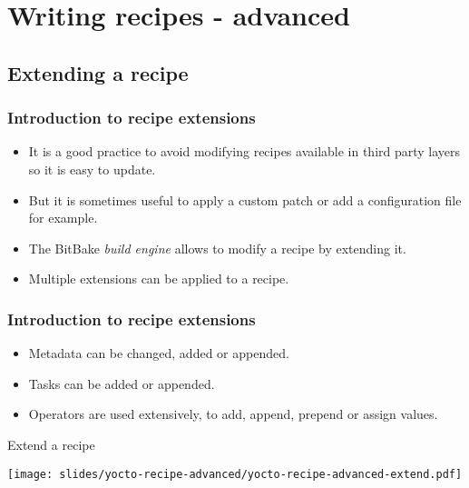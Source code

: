 \section{Writing recipes - advanced}

\subsection{Extending a recipe}

\begin{frame}
  \frametitle{Introduction to recipe extensions}
  \begin{itemize}
    \item It is a good practice to avoid modifying recipes available
          in third party layers so it is easy to update.
    \item But it is sometimes useful to apply a custom patch or add a
      configuration file for example.
    \item The BitBake \emph{build engine} allows to modify a recipe by
          extending it.
    \item Multiple extensions can be applied to a recipe.
  \end{itemize}
\end{frame}

\begin{frame}
  \frametitle{Introduction to recipe extensions}
  \begin{itemize}
    \item Metadata can be changed, added or appended.
    \item Tasks can be added or appended.
    \item Operators are used extensively, to add, append, prepend or
          assign values.
  \end{itemize}
\end{frame}

\begin{frame}{Extend a recipe}
  \begin{center}
    \texttt{[image: slides/yocto-recipe-advanced/yocto-recipe-advanced-extend.pdf]}
  \end{center}
\end{frame}

